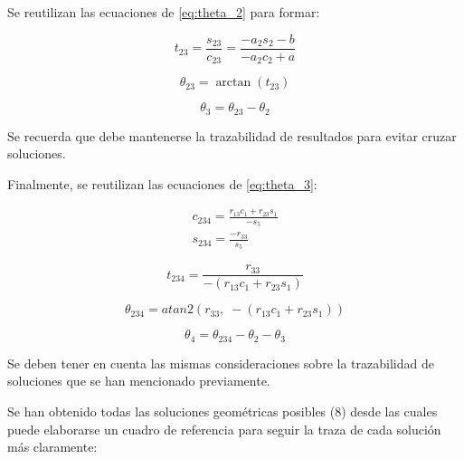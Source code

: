 \documentclass{article}
\begin{document}
Se reutilizan las ecuaciones de \ref{eq:theta_2} para formar:

\begin{equation}
    t_{23}=\frac{s_{23}}{c_{23}}=\frac{-a_2s_2-b}{-a_2c_2+a}
\end{equation}

\begin{equation}
    \theta_{23}=\arctan(t_{23})
\end{equation}

\begin{equation}
    \theta_3=\theta_{23}-\theta_2
\end{equation}

Se recuerda que debe mantenerse la trazabilidad de resultados para evitar cruzar soluciones.

Finalmente, se reutilizan las ecuaciones de \ref{eq:theta_3}:

\begin{equation}
    \begin{gathered}
        c_{234}=\frac{r_{13}c_1+r_{23}s_1}{-s_5}\\
        s_{234}=\frac{-r_{33}}{s_5}
    \end{gathered}
\end{equation}

\begin{equation}
    t_{234} = \frac{r_{33}}{-(r_{13}c_1+r_{23}s_1)}
\end{equation}

\begin{equation}
    \theta_{234} = atan2\!\left(r_{33},\; -(r_{13}c_1+r_{23}s_1)\right)
\end{equation}

\begin{equation}
    \theta_4 = \theta_{234}-\theta_2-\theta_3
\end{equation}

Se deben tener en cuenta las mismas consideraciones sobre la trazabilidad de soluciones que se han mencionado previamente.

Se han obtenido todas las soluciones geométricas posibles (8) desde las cuales puede elaborarse un cuadro de referencia para seguir la traza de cada solución más claramente:


\renewcommand{\arraystretch}{2}
\setlength{\tabcolsep}{15pt}
\end{document}
